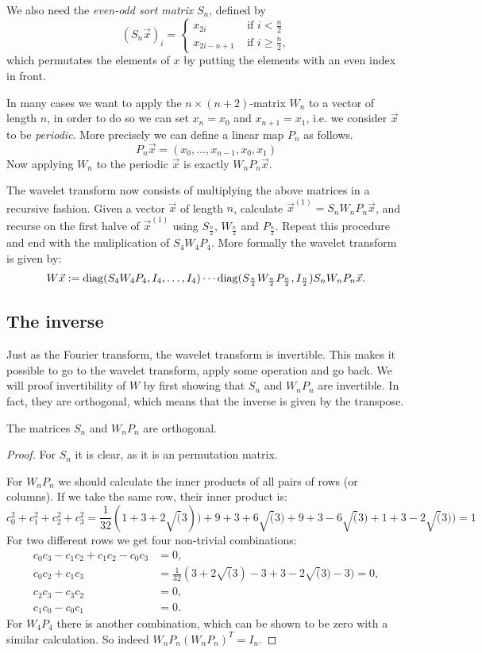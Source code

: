 We also need the \emph{even-odd sort matrix} $S_n$, defined by
\[ (S_n \vec{x})_i = \begin{cases}
	x_{2i}         &\mbox{ if } i  <   \frac{n}{2} \\
	x_{2i - n + 1} &\mbox{ if } i \geq \frac{n}{2},
\end{cases}\]
which permutates the elements of $x$ by putting the elements with an even index in front.

In many cases we want to apply the $n \times (n+2)$-matrix $W_n$ to a vector of length $n$, in order to do so we can set $x_n = x_0$ and $x_{n+1} = x_1$, i.e. we consider $\vec{x}$ to be \emph{periodic}. More precisely we can define a linear map $P_n$ as follows.
\[ P_n \vec{x} = (x_0, \ldots, x_{n-1}, x_0, x_1) \]
Now applying $W_n$ to the periodic $\vec{x}$ is exactly $W_n P_n \vec{x}$.

The wavelet transform now consists of multiplying the above matrices in a recursive fashion. Given a vector $\vec{x}$ of length $n$, calculate $\vec{x}^{(1)} = S_n W_n P_n \vec{x}$, and recurse on the first halve of $\vec{x}^{(1)}$ using $S_\frac{n}{2}$, $W_\frac{n}{2}$ and $P_\frac{n}{2}$. Repeat this procedure and end with the muliplication of $S_4 W_4 P_4$. More formally the wavelet transform is given by:
\[ W \vec{x} := \operatorname{diag}(S_4 W_4 P_4, I_4, \ldots, I_4) \cdots
             \operatorname{diag}(S_\frac{n}{2} W_\frac{n}{2} P_\frac{n}{2}, I_\frac{n}{2})
             S_n W_n P_n \vec{x}. \]


\subsection{The inverse}
Just as the Fourier transform, the wavelet transform is invertible. This makes it possible to go to the wavelet transform, apply some operation and go back. We will proof invertibility of $W$ by first showing that $S_n$ and $W_n P_n$ are invertible. In fact, they are orthogonal, which means that the inverse is given by the transpose.

\begin{lemma}
	The matrices $S_n$ and $W_n P_n$ are orthogonal.
\end{lemma}
\begin{proof}
	For $S_n$ it is clear, as it is an permutation matrix.

	For $W_n P_n$ we should calculate the inner products of all pairs of rows (or columns). If we take the same row, their inner product is:
	\[ c_0^2 + c_1^2 + c_2^2 + c_3^2 = \frac{1}{32}(1 + 3 + 2\sqrt(3)) + 9 + 3 + 6\sqrt(3) + 9 + 3 - 6\sqrt(3) + 1 + 3 -2\sqrt(3)) = 1 \]
	For two different rows we get four non-trivial combinations:
	\begin{align*}
		c_0c_3 - c_1c_2 + c_1c_2 - c_0c_3 &= 0, \\
		c_0c_2 + c_1c_3 &= \frac{1}{32}(3+2\sqrt(3)-3+3-2\sqrt(3)-3) = 0, \\
		c_2c_3 - c_3c_2 &= 0, \\
		c_1c_0 - c_0c_1 &= 0.
	\end{align*}
	For $W_4 P_4$ there is another combination, which can be shown to be zero with a similar calculation. So indeed $W_n P_n (W_n P_n)^T = I_n$.
\end{proof}

